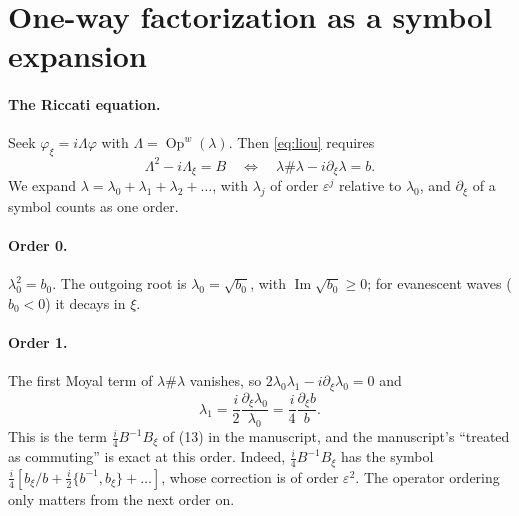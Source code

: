 \documentclass[11pt]{article}
\newcommand{\pd}{\partial}
\newcommand{\Op}{\operatorname{Op}^w}
\begin{document}
\section{One-way factorization as a symbol expansion}

\paragraph{The Riccati equation.} Seek $\varphi_\xi=i\Lambda\varphi$ with
$\Lambda=\Op(\lambda)$. Then \eqref{eq:liou} requires
\begin{equation}\label{eq:riccati}
\Lambda^2-i\Lambda_\xi=B
\quad\Longleftrightarrow\quad
\lambda\#\lambda-i\pd_\xi\lambda=b .
\end{equation}
We expand $\lambda=\lambda_0+\lambda_1+\lambda_2+\dots$, with $\lambda_j$ of
order $\varepsilon^j$ relative to $\lambda_0$, and $\pd_\xi$ of a symbol counts
as one order.

\paragraph{Order 0.} $\lambda_0^2=b_0$. The outgoing root is
$\lambda_0=\sqrt{b_0}$, with $\operatorname{Im}\sqrt{b_0}\ge0$; for evanescent
waves ($b_0<0$) it decays in $\xi$.

\paragraph{Order 1.} The first Moyal term of $\lambda\#\lambda$ vanishes, so
$2\lambda_0\lambda_1-i\pd_\xi\lambda_0=0$ and
\begin{equation}\label{eq:lambda1}
\lambda_1=\frac i2\frac{\pd_\xi\lambda_0}{\lambda_0}=\frac i4\frac{\pd_\xi b}{b}.
\end{equation}
This is the term $\tfrac i4B^{-1}B_\xi$ of (13) in the manuscript, and the
manuscript's ``treated as commuting'' is exact at this order. Indeed,
$\tfrac i4B^{-1}B_\xi$ has the symbol
$\tfrac i4[b_\xi/b+\tfrac i2\{b^{-1},b_\xi\}+\dots]$, whose correction is of
order $\varepsilon^2$. The operator ordering only matters from the next order
on.
\end{document}
